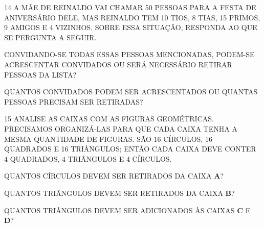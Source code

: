 

\num{14} A MÃE DE REINALDO VAI CHAMAR 50 PESSOAS PARA A FESTA DE ANIVERSÁRIO DELE,
MAS REINALDO TEM 10 TIOS, 8 TIAS, 15 PRIMOS, 9 AMIGOS E 4 VIZINHOS. SOBRE ESSA SITUAÇÃO, RESPONDA AO QUE SE PERGUNTA A SEGUIR.

\begin{escolha}
\item CONVIDANDO-SE TODAS ESSAS PESSOAS MENCIONADAS, PODEM-SE ACRESCENTAR CONVIDADOS OU SERÁ NECESSÁRIO RETIRAR PESSOAS DA LISTA?


\item QUANTOS CONVIDADOS PODEM SER ACRESCENTADOS OU QUANTAS PESSOAS PRECISAM SER
  RETIRADAS?

\end{escolha}

\num{15} ANALISE AS CAIXAS COM AS FIGURAS GEOMÉTRICAS. PRECISAMOS ORGANIZÁ-LAS PARA QUE CADA CAIXA TENHA A MESMA QUANTIDADE DE FIGURAS. SÃO 16 CÍRCULOS, 16 QUADRADOS E 16 TRIÂNGULOS; ENTÃO CADA CAIXA DEVE CONTER 4 QUADRADOS, 4 TRIÂNGULOS E 4 CÍRCULOS.


\item QUANTOS CÍRCULOS DEVEM SER RETIRADOS DA CAIXA \textbf{A}?


\item QUANTOS TRIÂNGULOS DEVEM SER RETIRADOS DA CAIXA \textbf{B}?


\item QUANTOS TRIÂNGULOS DEVEM SER ADICIONADOS ÀS CAIXAS \textbf{C} E \textbf{D}?

